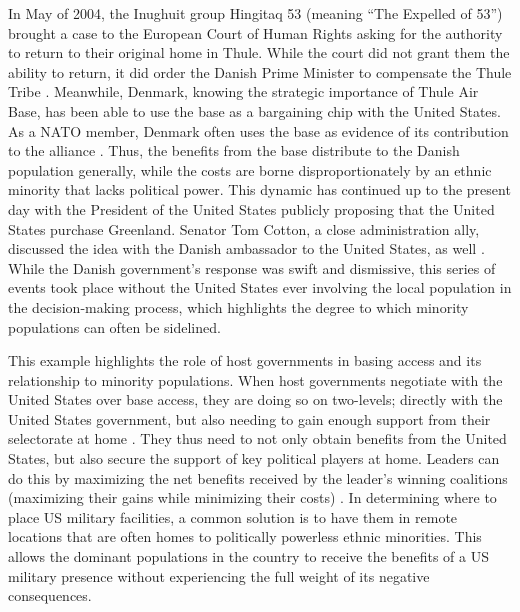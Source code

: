 In May of 2004, the Inughuit group Hingitaq 53 (meaning ``The Expelled of 53'') brought a case to the European Court of Human Rights asking for the authority to return to their original home in Thule. While the court did not grant them the ability to return, it did order the Danish Prime Minister to compensate the Thule Tribe \cite{Spiermann2004}. Meanwhile, Denmark, knowing the strategic importance of Thule Air Base, has been able to use the base as a bargaining chip with the United States. As a NATO member, Denmark often uses the base as evidence of its contribution to the alliance \cite{Dragsdahl2005}. Thus, the benefits from the base distribute to the Danish population generally, while the costs are borne disproportionately by an ethnic minority that lacks political power. This dynamic has continued up to the present day with the President of the United States publicly proposing that the United States purchase Greenland. Senator Tom Cotton, a close administration ally, discussed the idea with the Danish ambassador to the United States, as well \cite{hart2019,wu2019}. While the Danish government's response was swift and dismissive, this series of events took place without the United States ever involving the local population in the decision-making process, which highlights the degree to which minority populations can often be sidelined. 



This example highlights the role of host governments in basing access and its relationship to minority populations. When host governments negotiate with the United States over base access, they are doing so on two-levels; directly with the United States government, but also needing to gain enough support from their selectorate at home \cite{Putnam1988,demesquita2005,cooley2008}. They thus need to not only obtain benefits from the United States, but also secure the support of key political players at home. Leaders can do this by maximizing the net benefits received by the leader's winning coalitions (maximizing their gains while minimizing their costs) \cite{Mesquitaetal2005}. In determining where to place US military facilities, a common solution is to have them in remote locations that are often homes to politically powerless ethnic minorities. This allows the dominant populations in the country to receive the benefits of a US military presence without experiencing the full weight of its negative consequences.

